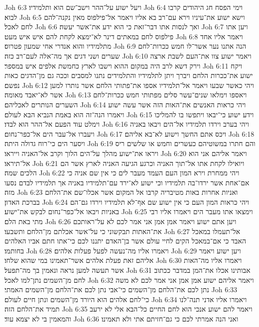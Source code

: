 Joh 6:3  ויעל ישוע על־ההר וישב־שם הוא ותלמידיו׃
Joh 6:4  וימי הפסח חג היהודים קרבו לבוא׃
Joh 6:5  וישא ישוע את־עיניו וירא עם־רב בא אליו ויאמר אל־פילפוס מאין נקנה־להם לחם לאכל׃
Joh 6:6  ואך לנסות אתו דבר־זאת כי הוא ידע את־אשר יעשה׃
Joh 6:7  ויען אתו פילפוס לחם במאתים דינר לא־ימצא לקחת להם איש איש מעט׃
Joh 6:8  ויאמר אליו אחד מתלמידיו והוא אנדרי אחי שמעון פטרוס׃
Joh 6:9  הנה אתנו נער אשר־לו חמש ככרות־לחם שערים ושני דגים אך מה־אלה לעם־רב כזה׃
Joh 6:10  ויאמר ישוע צוו את־העם לשבת ארצה וירק דשא לרב היה במקום ההוא וישבו לארץ כחמשת אלפים איש במספר׃
Joh 6:11  ויקח ישוע את־ככרות הלחם ויברך ויתן לתלמידיו והתלמידים נתנו למסבים וככה גם מן־הדגים כאות נפשם׃
Joh 6:12  ויהי כאשר שבעו ויאמר אל־תלמידיו אספו את־פתותי הלחם אשר נותרו למען אשר לא־יאבד מאומה׃
Joh 6:13  ויאספו וימלאו שנים־עשר סלים מפתותי חמש ככרות־לחם השערים הנותרים לאכליהם׃
Joh 6:14  ויהי כראות האנשים את־האות הזה אשר עשה ישוע ויאמרו הנה־זה הוא באמת הנביא הבא לעולם׃
Joh 6:15  וידע ישוע כי־יבאו ויתפשו בו להמליכו וימלט עוד הפעם אל־ההר הוא לבדו׃
Joh 6:16  ויהי בערב וירדו תלמידיו אל־הים ויבאו באניה ויעברו אל־עבר הים אל־כפר־נחום׃
Joh 6:17  ויכס אתם החשך וישוע לא־בא אליהם׃
Joh 6:18  ויסער הים כי־רוח גדולה היתה׃
Joh 6:19  והם חתרו במשוטיהם כעשרים וחמש או שלשים ריס ויראו את־ישוע מהלך על־הים הלוך וקרב אל־האניה וייראו׃
Joh 6:20  ויאמר אליהם אני הוא אל־תיראו׃
Joh 6:21  ויואילו לקחת אתו אל־תוך האניה וכרגע הגיעה האניה לארץ אשר הם הלכים שמה׃
Joh 6:22  ויהי ממחרת וירא המון העם העמד מעבר לים כי אין שם אניה כי אם־אחת אשר ירדו־בה תלמידיו וכי ישוע לא־ירד עם־תלמידיו באניה אך תלמידיו לבדם נסעו מזה׃
Joh 6:23  ואניות אחרות באות מטיבריה קרבו אל המקום אשר אכלו־שם את־הלחם בברכת האדון׃
Joh 6:24  ויהי כראות המון העם כי אין ישוע שם אף־לא תלמידיו וירדו גם־הם באניות ויבאו אל־כפר־נחום לבקש את־ישוע׃
Joh 6:25  וימצאו אתו מעבר הים ויאמרו אליו רבי מתי באת הלם׃
Joh 6:26  ויען אתם ישוע ויאמר אמן אמן אני אמר לכם לא על־ראותכם את־האתות תבקשוני כי על־אשר אכלתם מן־הלחם ותשבעו׃
Joh 6:27  אל־תעמלו במאכל האבד כי אם־במאכל הקים לחיי עולם אשר בן־האדם יתננו לכם כי־אתו חתם אביו האלהים בחותמו׃
Joh 6:28  ויאמרו אליו מה־נעשה לפעל פעלות אלהים׃
Joh 6:29  ויען ישוע ויאמר אליהם זאת פעלת אלהים אשר־תאמינו במי שהוא שלחו׃
Joh 6:30  ויאמרו אליו מה־האות אשר תעשה למען נראה ונאמין בך מה־תפעל׃
Joh 6:31  אבותינו אכלו את־המן במדבר ככתוב לחם מן־השמים נתן־למו לאכל׃
Joh 6:32  ויאמר אליהם ישוע אמן אמן אני אמר לכם לא משה נתן לכם את־הלחם מן־השמים כי־אבי נתן לכם את־הלחם מן־השמים האמתי׃
Joh 6:33  כי־לחם אלהים הוא היורד מן־השמים ונתן חיים לעולם׃
Joh 6:34  ויאמרו אליו אדני תנה־לנו תמיד את־הלחם הזה׃
Joh 6:35  ויאמר להם ישוע אנכי הוא לחם החיים כל־הבא אלי לא ירעב והמאמין בי לא יצמא עוד׃
Joh 6:36  ואני הנה אמרתי לכם כי גם־חזיתם אתי ולא תאמינו׃
